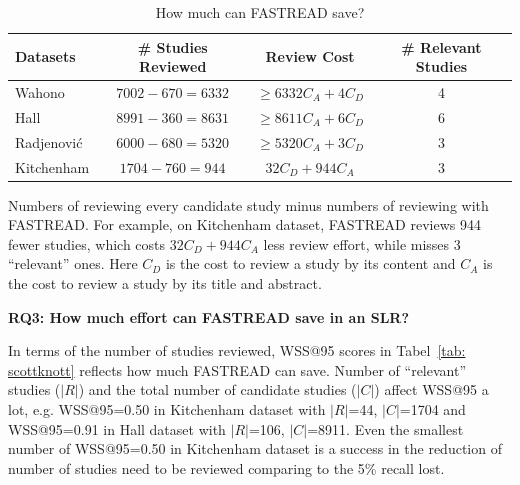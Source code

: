 \documentclass{svjour3}
\theoremstyle{break}
\begin{document}
\begin{table}
\caption{How much can FASTREAD save?}
\label{tab: save}
\begin{center}
\begin{tabular}{ |l|c|c|c|}
  \hline
   Datasets & \# Studies Reviewed & Review Cost & \# Relevant Studies \\
  \hline
  Wahono & $7002-670=6332$ & $\geq6332C_A+4C_D$ & 4\\
  \hline
  Hall & $8991-360=8631$ & $\geq8611C_A+6C_D$ & 6\\
  \hline
  Radjenovi{\'c} & $6000-680=5320$ & $\geq5320C_A+3C_D$ & 3\\
  \hline
  Kitchenham & $1704-760=944$ & $32C_D+944C_A$ & 3\\
  \hline
\end{tabular}
\end{center}
{\footnotesize Numbers of reviewing every candidate study minus numbers of reviewing with FASTREAD. For example, on Kitchenham dataset, FASTREAD reviews 944 fewer studies, which costs $32C_D+944C_A$ less review effort, while misses 3 ``relevant'' ones. Here $C_D$ is the cost to review a study by its content and $C_A$ is the cost to review a study by its title and abstract.}
\end{table}

\textbf{RQ3: How much effort can FASTREAD save in an SLR?}

In terms of the number of studies reviewed, WSS@95 scores in Tabel~\ref{tab: scottknott} reflects how much FASTREAD can save. Number of ``relevant'' studies ($|R|$) and the total number of candidate studies ($|C|$) affect WSS@95 a lot, e.g. WSS@95=0.50 in Kitchenham dataset with $|R|$=44, $|C|$=1704 and WSS@95=0.91 in Hall dataset with $|R|$=106, $|C|$=8911. Even the smallest number of WSS@95=0.50 in Kitchenham dataset is a success in the reduction of number of studies need to be reviewed comparing to the 5\% recall lost.
\end{document}

